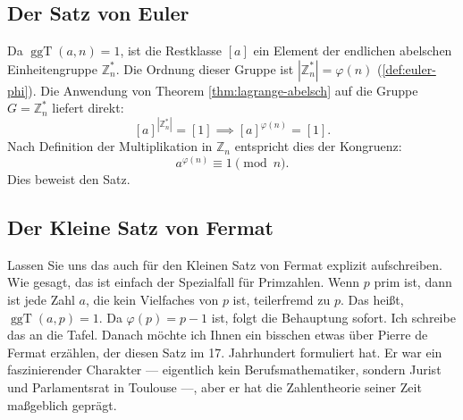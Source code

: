 \subsection{Der Satz von Euler}
\begin{math-stroke}

\begin{short-proof}
Da $\operatorname{ggT}(a, n) = 1$, ist die Restklasse $[a]$ ein Element der endlichen abelschen Einheitengruppe $\mathbb{Z}_n^*$. Die Ordnung dieser Gruppe ist $|\mathbb{Z}_n^*| = \varphi(n)$ (\cref{def:euler-phi}). Die Anwendung von Theorem \ref{thm:lagrange-abelsch} auf die Gruppe $G = \mathbb{Z}_n^*$ liefert direkt:
\[
[a]^{|\mathbb{Z}_n^*|} = [1] \implies [a]^{\varphi(n)} = [1].
\]
Nach Definition der Multiplikation in $\mathbb{Z}_n$ entspricht dies der Kongruenz:
\[
a^{\varphi(n)} \equiv 1 \pmod n.
\]
Dies beweist den Satz.
\end{short-proof}
\end{math-stroke}

\subsection{Der Kleine Satz von Fermat}

\begin{spoken-clean}[00:46:56 - 00:49:26]
Lassen Sie uns das auch für den Kleinen Satz von Fermat explizit aufschreiben. Wie gesagt, das ist einfach der Spezialfall für Primzahlen. Wenn $p$ prim ist, dann ist jede Zahl $a$, die kein Vielfaches von $p$ ist, teilerfremd zu $p$. Das heißt, $\operatorname{ggT}(a, p) = 1$. Da $\varphi(p) = p-1$ ist, folgt die Behauptung sofort. Ich schreibe das an die Tafel. Danach möchte ich Ihnen ein bisschen etwas über Pierre de Fermat erzählen, der diesen Satz im 17. Jahrhundert formuliert hat. Er war ein faszinierender Charakter --- eigentlich kein Berufsmathematiker, sondern Jurist und Parlamentsrat in Toulouse ---, aber er hat die Zahlentheorie seiner Zeit maßgeblich geprägt.
\end{spoken-clean}


